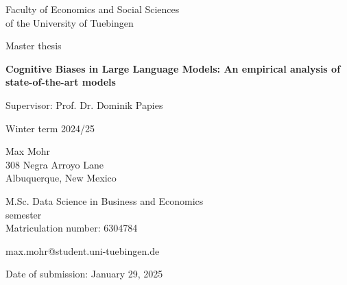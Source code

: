 \documentclass[12pt, a4paper, titlepage]{article}
\begin{document}
\begin{titlepage}
  \begin{center}
    Faculty of Economics and Social Sciences\\
    of the University of Tuebingen

    \vspace{3cm}

    Master thesis

    \vspace{1cm}

    {\Large\textbf{Cognitive Biases in Large Language Models: An empirical analysis of state-of-the-art models}}

    \vspace{0.5cm}

    Supervisor: Prof. Dr. Dominik Papies

    \vspace{0.5cm}

    Winter term 2024/25

  \end{center}

  \vfill

  \begin{multicols}{2}
    \small
    Max Mohr\\
    308 Negra Arroyo Lane\\
    Albuquerque, New Mexico

    \vfill

    M.Sc. Data Science in Business and Economics\\
     semester\\
    Matriculation number: 6304784
  \end{multicols}

  \begin{multicols}{2}
    \small
    max.mohr@student.uni-tuebingen.de\\

    \vfill

    Date of submission: January 29, 2025

  \end{multicols}
\end{titlepage}

\newpage
{} %
\setcounter{page}{1}

\end{document}
